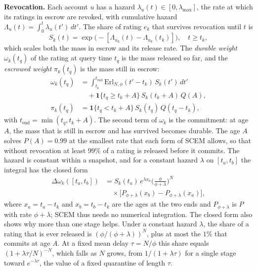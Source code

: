 \documentclass[lettersize,journal]{IEEEtran}
\begin{document}
\smallskip\noindent\textbf{Revocation.}
Each account $u$ has a hazard $\lambda_u(t) \in [0, \lambda_{\max}]$, the rate at which its ratings in escrow are revoked, with cumulative hazard $\Lambda_u(t) = \int_0^t \lambda_u(t')\,dt'$.
The share of rating $e_k$ that survives revocation until $t$ is
\begin{equation}
\label{eq:scem_survival}
S_k(t) = \exp\!\big(-[\Lambda_{u_k}(t) - \Lambda_{u_k}(t_k)]\big), \quad t \ge t_k,
\end{equation}
which scales both the mass in escrow and its release rate.
The \emph{durable weight} $\omega_k(t_q)$ of the rating at query time $t_q$ is the mass released so far, and the \emph{escrowed weight} $\pi_k(t_q)$ is the mass still in escrow:
\begin{equation}
\label{eq:scem_omega_def}
\begin{aligned}
\omega_k(t_q) &= \!\int_{t_k}^{t_{\mathrm{end}}}\! \mathrm{Erl}_{N,\phi}(t'-t_k)\,S_k(t')\,dt' \\
&\quad + \mathbf{1}\{t_q \ge t_k + A\}\, S_k(t_k+A)\,Q(A), \\
\pi_k(t_q) &= \mathbf{1}\{t_q < t_k + A\}\, S_k(t_q)\, Q(t_q - t_k),
\end{aligned}
\end{equation}
with $t_{\mathrm{end}} = \min(t_q, t_k + A)$.
The second term of $\omega_k$ is the commitment: at age $A$, the mass that is still in escrow and has survived becomes durable.
The age $A$ solves $P(A) = 0.99$ at the smallest rate that each form of SCEM allows, so that without revocation at least $99\%$ of a rating is released before it commits.
The hazard is constant within a snapshot, and for a constant hazard $\lambda$ on $[t_a, t_b]$ the integral has the closed form~\cite{hurtado2019generalized}
\begin{equation}
\label{eq:scem_segment}
\begin{aligned}
\Delta\omega_k([t_a, t_b]) &= S_k(t_a)\, e^{\lambda x_a}\Big(\frac{\phi}{\phi+\lambda}\Big)^{\!N} \\
&\quad \times \big[P_{\phi+\lambda}(x_b) - P_{\phi+\lambda}(x_a)\big],
\end{aligned}
\end{equation}
where $x_a = t_a - t_k$ and $x_b = t_b - t_k$ are the ages at the two ends and $P_{\phi+\lambda}$ is $P$ with rate $\phi + \lambda$; SCEM thus needs no numerical integration.
The closed form also shows why more than one stage helps.
Under a constant hazard $\lambda$, the share of a rating that is ever released is $(\phi/(\phi+\lambda))^N$, plus at most the $1\%$ that commits at age $A$.
At a fixed mean delay $\tau = N/\phi$ this share equals $(1 + \lambda \tau/N)^{-N}$, which falls as $N$ grows, from $1/(1 + \lambda \tau)$ for a single stage toward $e^{-\lambda \tau}$, the value of a fixed quarantine of length $\tau$.
\end{document}
